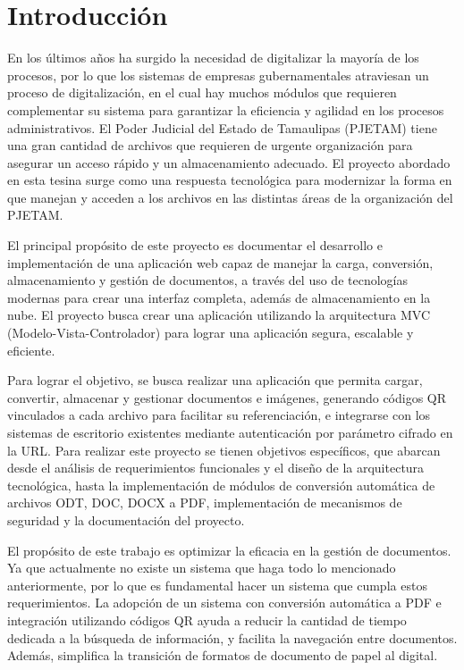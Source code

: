 \section{Introducción}
\label{ch:introduccion}

En los últimos años ha surgido la necesidad de digitalizar la mayoría de los procesos, por lo que los sistemas de empresas gubernamentales atraviesan un proceso de digitalización, en el cual hay muchos módulos que requieren complementar su sistema para garantizar la eficiencia y agilidad en los procesos administrativos. El Poder Judicial del Estado de Tamaulipas (PJETAM) tiene una gran cantidad de archivos que requieren de urgente organización para asegurar un acceso rápido y un almacenamiento adecuado. El proyecto abordado en esta tesina surge como una respuesta tecnológica para modernizar la forma en que manejan y acceden a los archivos en las distintas áreas de la organización del PJETAM.

El principal propósito de este proyecto es documentar el desarrollo e implementación de una aplicación web capaz de manejar la carga, conversión, almacenamiento y gestión de documentos, a través del uso de tecnologías modernas para crear una interfaz completa, además de almacenamiento en la nube. El proyecto busca crear una aplicación utilizando la arquitectura MVC  (Modelo-Vista-Controlador) para lograr una aplicación segura, escalable y eficiente.

Para lograr el objetivo, se busca realizar una aplicación que permita cargar, convertir, almacenar y gestionar documentos e imágenes, generando códigos QR vinculados a cada archivo para facilitar su referenciación, e integrarse con los sistemas de escritorio existentes mediante autenticación por parámetro cifrado en la URL. Para realizar este proyecto se tienen objetivos específicos, que abarcan desde el análisis de requerimientos funcionales y el diseño de la arquitectura tecnológica, hasta la implementación de módulos de conversión automática de archivos ODT, DOC, DOCX a PDF, implementación de mecanismos de seguridad y la documentación del proyecto.

El propósito de este trabajo es optimizar la eficacia en la gestión de documentos. Ya que actualmente no existe un sistema que haga todo lo mencionado anteriormente, por lo que es fundamental hacer un sistema que cumpla estos requerimientos. La adopción de un sistema con conversión automática a PDF e integración utilizando códigos QR ayuda a reducir la cantidad de tiempo dedicada a la búsqueda de información, y facilita la navegación entre documentos. Además, simplifica la transición de formatos de documento de papel al digital.

